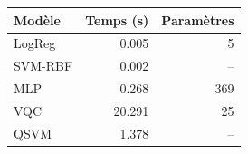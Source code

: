 \begin{tabular}{lrr}
\toprule
Modèle & Temps (s) & Paramètres \\
\midrule
LogReg & 0.005 & 5 \\
SVM-RBF & 0.002 & -- \\
MLP & 0.268 & 369 \\
VQC & 20.291 & 25 \\
QSVM & 1.378 & -- \\
\bottomrule
\end{tabular}